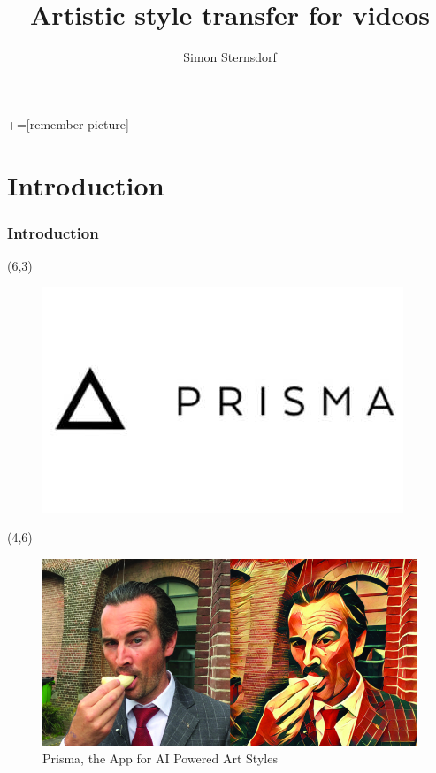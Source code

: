 \documentclass{beamer} %
\author{Simon Sternsdorf}
\title{Artistic style transfer for videos}
\begin{document}



+=[remember picture]

\everymath{\displaystyle}
\begin{frame}
\titlepage
\end{frame}



\section{Introduction}
\begin{frame}
\frametitle{Introduction}


\begin{textblock}{1}(6,3)
	\begin{figure}
	\includegraphics[scale=0.2]{figures/Prisma}

	\end{figure}
	
 \end{textblock}


\begin{textblock}{5}(4,6)
	\begin{figure}
	\includegraphics[scale=1]{figures/prisma2}
	\caption{Prisma, the App for AI Powered Art Styles}
	\end{figure}
 \end{textblock} 

\end{frame}
\end{document}
